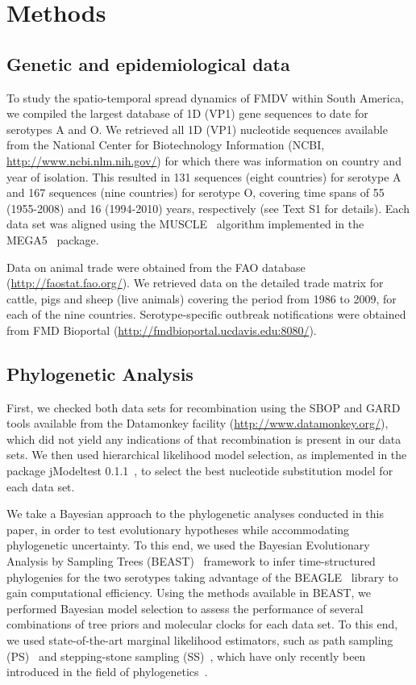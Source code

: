 \documentclass[10pt]{article}
\begin{document}
\section*{Methods}

\subsection*{Genetic and epidemiological data}

To study the spatio-temporal spread dynamics of FMDV within South America, we compiled the largest database of 1D (VP1) gene sequences to date for serotypes A and O.
We retrieved all 1D (VP1) nucleotide sequences available from the National Center for Biotechnology Information (NCBI, \url{ http://www.ncbi.nlm.nih.gov/}) for which there was information on country and year of isolation.
This resulted in 131 sequences (eight countries) for serotype A and 167 sequences (nine countries) for serotype O, covering time spans of 55 (1955-2008) and 16 (1994-2010) years, respectively (see Text S1 for details).
Each data set was aligned using the MUSCLE~\cite{muscle} algorithm implemented in the MEGA5~\cite{MEGA} package.

Data on animal trade were obtained from the FAO database (\url{http://faostat.fao.org/}).
We retrieved data on the detailed trade matrix for cattle, pigs and sheep (live animals) covering the period from 1986 to 2009, for each of the nine countries.
Serotype-specific outbreak notifications were obtained from FMD Bioportal (\url{http://fmdbioportal.ucdavis.edu:8080/}).

\subsection*{Phylogenetic Analysis}

First, we checked both data sets for recombination using the SBOP and GARD~\cite{sbpgard} tools available from the Datamonkey facility (\url{http://www.datamonkey.org/}), which did not yield any indications of that recombination is present in our data sets.
We then used hierarchical likelihood model selection, as implemented in the package jModeltest 0.1.1~\cite{jmodel}, to select the best nucleotide substitution model for each data set.

We take a Bayesian approach to the phylogenetic analyses conducted in this paper, in order to test evolutionary hypotheses while accommodating phylogenetic uncertainty. 
To this end, we used the Bayesian Evolutionary Analysis by Sampling Trees (BEAST)~\cite{beast2012} framework to infer time-structured phylogenies for the two serotypes taking advantage of the  BEAGLE~\cite{BEAGLE} library to gain computational efficiency.
Using the methods available in BEAST, we performed Bayesian model selection to assess the performance of several combinations of tree priors and molecular clocks for each data set.
To this end, we used state-of-the-art marginal likelihood estimators, such as path sampling (PS)~\cite{LartillotPhilippe} and stepping-stone sampling (SS)~\cite{Xie}, which have only recently been introduced in the field of phylogenetics~\cite{LartillotPhilippe, Xie, Baele2012, Baele2013a, Baele2013b}.
\end{document}
